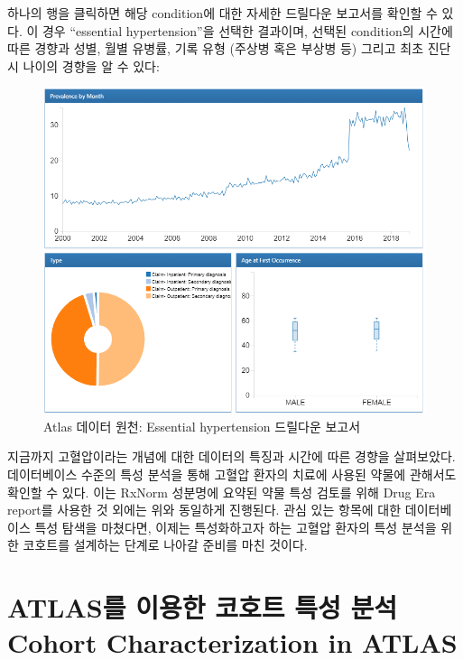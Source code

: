 \documentclass[10.5pt]{book}
\theoremstyle{definition}
\theoremstyle{definition}
\theoremstyle{definition}
\theoremstyle{remark}
\begin{document}
하나의 행을 클릭하면 해당 condition에 대한 자세한 드릴다운 보고서를
확인할 수 있다. 이 경우 ``essential hypertension''을 선택한 결과이며,
선택된 condition의 시간에 따른 경향과 성별, 월별 유병률, 기록 유형
(주상병 혹은 부상병 등) 그리고 최초 진단 시 나이의 경향을 알 수 있다:

\begin{figure}

{\centering \includegraphics[width=1\linewidth]{images/Characterization/atlasDataSourcesDrillDownReport} 

}

\caption{Atlas 데이터 원천: Essential hypertension 드릴다운 보고서}\label{fig:atlasDataSourcesDrillDownReport}
\end{figure}

지금까지 고혈압이라는 개념에 대한 데이터의 특징과 시간에 따른 경향을
살펴보았다. 데이터베이스 수준의 특성 분석을 통해 고혈압 환자의 치료에
사용된 약물에 관해서도 확인할 수 있다. 이는 RxNorm 성분명에 요약된 약물
특성 검토를 위해 Drug Era report를 사용한 것 외에는 위와 동일하게
진행된다. 관심 있는 항목에 대한 데이터베이스 특성 탐색을 마쳤다면,
이제는 특성화하고자 하는 고혈압 환자의 특성 분석을 위한 코호트를
설계하는 단계로 나아갈 준비를 마친 것이다.

\section{ATLAS를 이용한 코호트 특성 분석 Cohort Characterization in
ATLAS}\label{atlas-----cohort-characterization-in-atlas}
\end{document}
